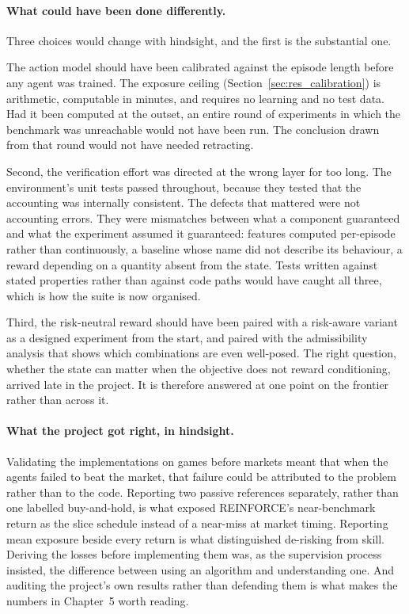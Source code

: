\paragraph{What could have been done differently.} Three choices would
change with hindsight, and the first is the substantial one.

The action model should have been calibrated against the episode length
before any agent was trained. The exposure ceiling
(Section~\ref{sec:res_calibration}) is arithmetic, computable in minutes,
and requires no learning and no test data. Had it been computed at the
outset, an entire round of experiments in which the benchmark was
unreachable would not have been run. The conclusion drawn from that
round would not have needed retracting.

Second, the verification effort was directed at the wrong layer for too
long. The environment's unit tests passed throughout, because they tested
that the accounting was internally consistent. The defects that mattered
were not accounting errors. They were mismatches between what a component
guaranteed and what the experiment assumed it guaranteed: features computed
per-episode rather than continuously, a baseline whose name did not describe
its behaviour, a reward depending on a quantity absent from the state. Tests
written against stated properties rather than against code paths would have
caught all three, which is how the suite is now organised.

Third, the risk-neutral reward should have been paired with a risk-aware
variant as a designed experiment from the start, and paired with the
admissibility analysis that shows which combinations are even well-posed.
The right question, whether the state can matter when the objective does
not reward conditioning, arrived late in the project. It is therefore
answered at one point on the frontier rather than across it.

\paragraph{What the project got right, in hindsight.} Validating the
implementations on games before markets meant that when the agents failed to
beat the market, that failure could be attributed to the problem rather than
to the code. Reporting two passive references separately, rather than one
labelled buy-and-hold, is what exposed REINFORCE's near-benchmark return as
the slice schedule instead of a near-miss at market timing. Reporting mean
exposure beside every return is what distinguished de-risking from skill.
Deriving the losses before implementing them was, as the supervision process
insisted, the difference between using an algorithm and understanding one.
And auditing the project's own results rather than defending them is what
makes the numbers in Chapter~5 worth reading.

